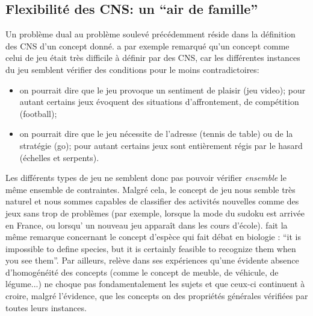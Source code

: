 \documentclass[french]{article}
\begin{document}
			\subsection{Flexibilité des CNS: un ``air de famille''}
				Un problème dual au problème soulevé précédemment réside dans la définition des CNS d'un concept donné. \cite{wittgenstein1953} a par exemple remarqué qu'un concept comme celui de jeu était très difficile à définir par des CNS, car les différentes instances du jeu semblent vérifier des conditions pour le moins contradictoires:
				\begin{itemize}
					\item on pourrait dire que le jeu provoque un sentiment de plaisir (jeu video); pour autant certains jeux évoquent des situations d'affrontement, de compétition (football);
					\item on pourrait dire que le jeu nécessite de l'adresse (tennis de table) ou de la stratégie (go); pour autant certains jeux sont entièrement régis par le hasard (échelles et serpents).
				\end{itemize}
				Les différents types de jeu ne semblent donc pas pouvoir vérifier \textit{ensemble} le même ensemble de contraintes. Malgré cela, le concept de jeu nous semble très naturel et nous sommes capables de classifier des activités nouvelles comme des jeux sans trop de problèmes (par exemple, lorsque la mode du sudoku est arrivée en France, ou lorsqu' un nouveau jeu apparaît dans les cours d'école). \cite{pigliucci2003} fait la même remarque concernant le concept d'espèce qui fait débat en biologie : ``it is impossible to define species, but it is certainly feasible to recognize them when you see them''. Par ailleurs, \cite{rosch1975} relève dans ses expériences qu'une évidente absence d'homogénéité des concepts (comme le concept de meuble, de véhicule, de légume...) ne choque pas fondamentalement les sujets et que ceux-ci continuent à croire, malgré l'évidence, que les concepts on des propriétés générales vérifiées par toutes leurs instances.\\
				
\end{document}
